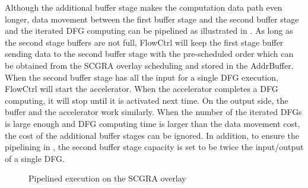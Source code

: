 Although the additional buffer stage makes the computation data path even 
longer, data movement between the first buffer stage and the second buffer 
stage and the iterated DFG computing can be pipelined as illustrated in . 
As long as the second stage buffers are not full, FlowCtrl will keep the 
first stage buffer sending data to the second buffer stage with the 
pre-scheduled order which can be obtained from the SCGRA overlay scheduling 
and stored in the AddrBuffer. When the second buffer stage has all the input for a 
single DFG execution, FlowCtrl will start the accelerator. When the 
accelerator completes a DFG computing, it will stop until it is activated 
next time. On the output side, the buffer and the accelerator work similarly.
When the number of the iterated DFGs is large enough and DFG computing 
time is larger than the data movement cost, the cost of the 
additional buffer stages can be ignored. In addition,  
to ensure the pipelining in , 
the second buffer stage capacity is set to be twice the input/output 
of a single DFG. 

\begin{figure}[tb]
\caption{Pipelined execution on the SCGRA overlay}
\label{fig:buffer-pipelining}
\end{figure}


